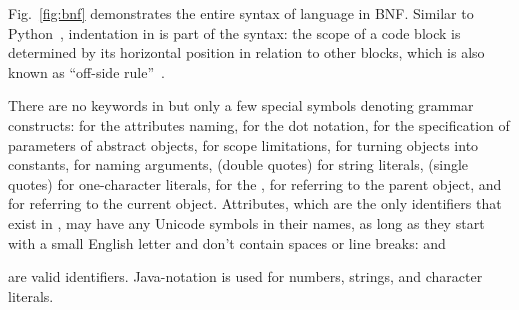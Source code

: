 Fig.~\ref{fig:bnf} demonstrates the entire syntax of \eo{} language in BNF.
Similar to Python~\citep{lutz2013learning}, indentation in \eo{} is part of the syntax:
the scope of a code block is determined by its horizontal position
in relation to other blocks, which is also known as ``off-side rule''~\citep{landin1966next}.

There are no keywords in \eo{} but only a few special symbols
denoting grammar constructs:
  \ff{>} for the attributes naming,
   for the dot notation,
  \ff{[]} for the specification of parameters of abstract objects,
  \ff{()} for scope limitations,
  \ff{!} for turning objects into constants,
  \ff{:} for naming arguments,
   (double quotes) for string literals,
   (single quotes) for one-character literals,
   for the ,
  \ff{\^{}} for referring to the parent object,
  and
  \ff{\$} for referring to the current object.
Attributes, which are the only identifiers that exist in \eo{}, may have
any Unicode symbols in their names, as long as they start with a small English letter
and don't contain spaces or line breaks:
 and
\begin{CJK}{UTF8}{gbsn}
\end{CJK}
 are valid identifiers.
Java-notation is used for numbers, strings, and character literals.

